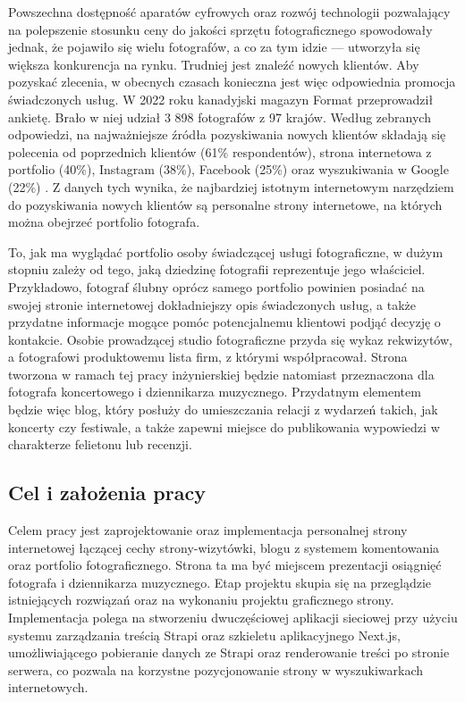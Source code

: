 \documentclass[12pt]{article}
\numberwithin{figure}{section}
\begin{document}
\begin{sloppypar}
Powszechna dostępność aparatów cyfrowych oraz rozwój technologii pozwalający na polepszenie stosunku ceny do jakości sprzętu fotograficznego spowodowały jednak, że pojawiło się wielu fotografów, a co za tym idzie --- utworzyła się większa konkurencja na rynku. Trudniej jest znaleźć nowych klientów. Aby pozyskać zlecenia, w obecnych czasach konieczna jest więc odpowiednia promocja świadczonych usług. W 2022 roku kanadyjski magazyn Format przeprowadził ankietę. Brało w niej udział 3 898 fotografów z 97 krajów. Według zebranych odpowiedzi, na najważniejsze źródła pozyskiwania nowych klientów składają się polecenia od poprzednich klientów (61\% respondentów), strona internetowa z portfolio (40\%), Instagram (38\%), Facebook (25\%) oraz wyszukiwania w Google (22\%) \cite{stateofphotography}. Z danych tych wynika, że najbardziej istotnym internetowym narzędziem do pozyskiwania nowych klientów są personalne strony internetowe, na których można obejrzeć portfolio fotografa.

To, jak ma wyglądać portfolio osoby świadczącej usługi fotograficzne, w dużym stopniu zależy od tego, jaką dziedzinę fotografii reprezentuje jego właściciel. Przykładowo, fotograf ślubny oprócz samego portfolio powinien posiadać na swojej stronie internetowej dokładniejszy opis świadczonych usług, a także przydatne informacje mogące pomóc potencjalnemu klientowi podjąć decyzję o kontakcie. Osobie prowadzącej studio fotograficzne przyda się wykaz rekwizytów, a fotografowi produktowemu lista firm, z którymi współpracował. Strona tworzona w ramach tej pracy inżynierskiej będzie natomiast przeznaczona dla fotografa koncertowego i dziennikarza muzycznego. Przydatnym elementem będzie więc blog, który posłuży do umieszczania relacji z wydarzeń takich, jak koncerty czy festiwale, a także zapewni miejsce do publikowania wypowiedzi w charakterze felietonu lub recenzji.



\subsection{Cel i założenia pracy}

Celem pracy jest zaprojektowanie oraz implementacja personalnej strony internetowej łączącej cechy strony-wizytówki, blogu z systemem komentowania oraz portfolio fotograficznego. Strona ta ma być miejscem prezentacji osiągnięć fotografa i dziennikarza muzycznego. Etap projektu skupia się na przeglądzie istniejących rozwiązań oraz na wykonaniu projektu graficznego strony. Implementacja polega na stworzeniu dwuczęściowej aplikacji sieciowej przy użyciu systemu zarządzania treścią Strapi oraz szkieletu aplikacyjnego Next.js, umożliwiającego pobieranie danych ze Strapi oraz renderowanie treści po stronie serwera, co pozwala na korzystne pozycjonowanie strony w wyszukiwarkach internetowych. 


\end{sloppypar}
\end{document}
